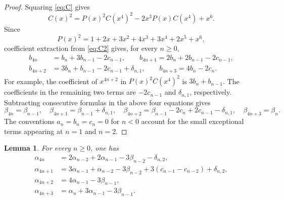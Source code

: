\documentclass[10pt,a4paper]{amsart}
\newtheorem{lemma}[theorem]{Lemma}
\begin{document}
\begin{proof}
Squaring \eqref{eq:C} gives
\begin{equation}\label{eq:C2}
C(x)^2=P(x)^2C(x^4)^2-2x^3P(x)C(x^4)+x^6.
\end{equation}
Since
\[
P(x)^2=1+2x+3x^2+4x^3+3x^4+2x^5+x^6,
\]
coefficient extraction from \eqref{eq:C2} gives, for every $n\ge 0$,
\[
\begin{aligned}
b_{4n}&=b_n+3b_{n-1}-2c_{n-1},\qquad
b_{4n+1}=2b_n+2b_{n-1}-2c_{n-1},\\
b_{4n+2}&=3b_n+b_{n-1}-2c_{n-1}+\delta_{n,1},\qquad
b_{4n+3}=4b_n-2c_n.
\end{aligned}
\]
For example, the coefficient of $x^{4n+2}$ in $P(x)^2C(x^4)^2$ is $3b_n+b_{n-1}$. The coefficients in the remaining two terms are $-2c_{n-1}$ and $\delta_{n,1}$, respectively. Subtracting consecutive formulas in the above four equations gives
\[
\beta_{4n}=\beta_{n-1},\quad
\beta_{4n+1}=\beta_{n-1}+\delta_{n,1},\quad
\beta_{4n+2}=\beta_{n-1}-2c_n+2c_{n-1}-\delta_{n,1},\quad
\beta_{4n+3}=\beta_n.
\]
The conventions $a_n=b_n=c_n=0$ for $n<0$ account for the small exceptional terms appearing at $n=1$ and $n=2$.
\end{proof}

\begin{lemma}\label{lem:alpha-rec}
For every $n\ge 0$, one has
\[
\begin{aligned}
\alpha_{4n}&=2\alpha_{n-2}+2\alpha_{n-1}-3\beta_{n-2}-\delta_{n,2},\\
\alpha_{4n+1}&=3\alpha_{n-1}+\alpha_{n-2}-3\beta_{n-2}+3(c_{n-1}-c_{n-2})+\delta_{n,2},\\
\alpha_{4n+2}&=4\alpha_{n-1}-3\beta_{n-1},\\
\alpha_{4n+3}&=\alpha_n+3\alpha_{n-1}-3\beta_{n-1}.
\end{aligned}
\]
\end{lemma}
\end{document}
